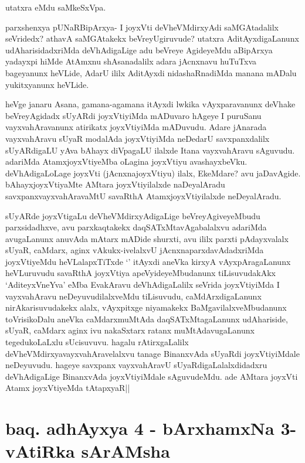 \begin{artha}%
utatxra \stext  eMdu saMkeSxVpa. 

parxshenxya pUNaRBipArxya- I joyxVti deVheVMdirxyAdi saMGAtadalilx seVridedx? athavA saMGAtakekx beVreyUgiruvude? utatxra AditAyxdigaLanunx udAharisidadxriMda deVhAdigaLige adu beVreye AgideyeMdu aBipArxya yadayxpi hiMde AtAmxnu shAsanadalilx adara jAcnxnavu huTuTxva bageyanunx heVLide, AdarU ililx AditAyxdi nidashaRnadiMda manana mADalu yukitxyanunx heVLide. 
\end{artha}

\begin{artha}
heVge janaru Asana, gamana-agamana itAyxdi lwkika vAyxparavanunx deVhake beVreyAgidadx sUyARdi joyxVtiyiMda mADuvaro hAgeye I puruSanu vayxvahAravanunx atirikatx joyxVtiyiMda mADuvudu. Adare jAnarada vayxvahAravu sUyaR modalAda joyxVtiyiMda neDedarU savxpanxdalilx sUyARdigaLU yAva bAhayx diVpagaLU ilalxde Itana vayxvahAravu sAguvudu. adariMda AtamxjoyxVtiyeMba oLagina joyxVtiyu avashayxbeVku. deVhAdigaLoLage joyxVti (jAcnxnajoyxVtiyu) ilalx, EkeMdare? avu jaDavAgide. bAhayxjoyxVtiyaMte AMtara joyxVtiyilalxde naDeyalAradu savxpanxvayxvahAravaMtU savaRthA AtamxjoyxVtiyilalxde neDeyalAradu.  
\end{artha}

\begin{artha}
sUyARde joyxVtigaLu deVheVMdirxyAdigaLige beVreyAgiveyeMbudu parxsidadhxve, avu parxkaqtakekx daqSATxMtavAgabalalxvu adariMda avugaLanunx anuvAda mAtarx mADide shurxti, avu ililx parxti pAdayxvalalx sUyaR, caMdarx, aginx vAkukx-ivelalxvU jAcnxnaparxdavAdadxriMda joyxVtiyeMdu heVLalapxTiTxde `\stext ' itAyxdi aneVka kirxyA vAyxpAragaLanunx heVLuruvudu savaRthA joyxVtiya apeVyideyeMbudanunx tiLisuvudakAkx `AditeyxVneYva' eMba EvakAravu deVhAdigaLalilx seVrida joyxVtiyiMda I vayxvahAravu neDeyuvudilalxveMdu tiLisuvudu, caMdArxdigaLanunx nirAkarisuvudakekx alalx, vAyxpitxge niyamakekx BaMgavilalxveMbudanunx toVrisikoDalu aneVka caMdarxmuMtAda daqSATxMtagaLanunx udAhariside, sUyaR, caMdarx aginx ivu nakaSxtarx ratanx muMtAdavugaLanunx tegedukoLaLxlu sUcisuvuvu. hagalu rAtirxgaLalilx deVheVMdirxyavayxvahAravelalxvu tanage BinanxvAda sUyaRdi joyxVtiyiMdale neDeyuvudu. hageye savxpanx vayxvahAravU sUyaRdigaLalalxdidadxru deVhAdigaLige BinanxvAda joyxVtiyiMdale sAguvudeMdu. ade AMtara joyxVti Atamx joyxVtiyeMda tAtapxyaR||
\end{artha}

\section*{baq. adhAyxya 4 - bArxhamxNa 3-vAtiRka sArAMsha}

